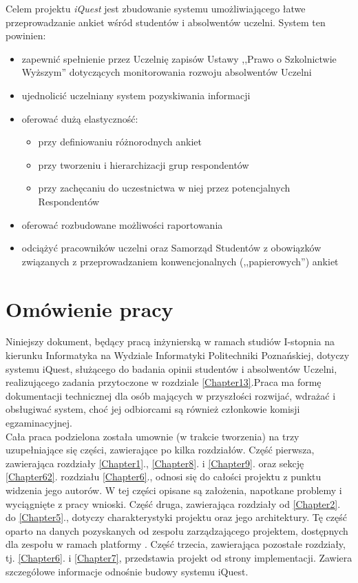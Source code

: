 Celem projektu \textit{iQuest} jest zbudowanie systemu umożliwiającego łatwe przeprowadzanie ankiet wśród studentów i absolwentów uczelni. System ten powinien:
\begin{itemize}
\item{zapewnić spełnienie przez Uczelnię zapisów Ustawy ,,Prawo o Szkolnictwie Wyższym'' dotyczących monitorowania rozwoju absolwentów Uczelni\cite{AP:PoSW05}}
\item{ujednolicić uczelniany system pozyskiwania informacji}
\item{oferować dużą elastyczność:
\begin{itemize}
\item{przy definiowaniu różnorodnych ankiet}
\item{przy tworzeniu i hierarchizacji grup respondentów}
\item{przy zachęcaniu do uczestnictwa w niej przez potencjalnych Respondentów}
\end{itemize}}
\item{oferować rozbudowane możliwości raportowania}
\item{odciążyć pracowników uczelni oraz Samorząd Studentów z obowiązków związanych z przeprowadzaniem konwencjonalnych (,,papierowych'') ankiet}
\end{itemize}

\section{Omówienie pracy}
\label{Chapter14}

Niniejszy dokument, będący pracą inżynierską w ramach studiów I-stopnia na kierunku Informatyka na Wydziale Informatyki Politechniki Poznańskiej, dotyczy systemu iQuest, służącego do badania opinii studentów i absolwentów Uczelni, realizującego zadania przytoczone w rozdziale \ref{Chapter13}.Praca ma formę dokumentacji technicznej dla osób mających w przyszłości rozwijać, wdrażać i obsługiwać system, choć jej odbiorcami są również członkowie komisji egzaminacyjnej. \\

Cała praca podzielona została umownie (w trakcie tworzenia) na trzy uzupełniające się części, zawierające po kilka rozdziałów. Część pierwsza, zawierająca rozdziały \ref{Chapter1}., \ref{Chapter8}. i \ref{Chapter9}. oraz sekcję \ref{Chapter62}. rozdziału \ref{Chapter6}., odnosi się do całości projektu z punktu widzenia jego autorów. W tej części opisane są założenia, napotkane problemy i wyciągnięte z pracy wnioski. Część druga, zawierająca rozdziały od \ref{Chapter2}. do \ref{Chapter5}., dotyczy charakterystyki projektu oraz jego architektury. Tę część oparto na danych pozyskanych od zespołu zarządzającego projektem\cite{Redmine:ProjDocs}, dostępnych dla zespołu w ramach platformy . Część trzecia, zawierająca pozostałe rozdziały, tj. \ref{Chapter6}. i \ref{Chapter7}, przedstawia projekt od strony implementacji. Zawiera szczegółowe informacje odnośnie budowy systemu iQuest. \\

